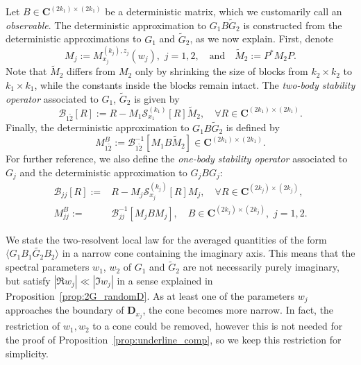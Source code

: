 \documentclass[10pt]{amsart}
\numberwithin{equation}{section}
\newcommand{\C}{\mathbf{C}}
\newcommand{\DD}{\mathbf{D}}
\begin{document}
Let $B\in\C^{(2k_1)\times (2k_1)}$ be a deterministic matrix, which we customarily call an \emph{observable}. The deterministic approximation to $G_1B\widetilde{G}_2$ is constructed from the deterministic approximations to $G_1$ and $\widetilde{G}_2$, as we now explain. First, denote
\begin{equation}
M_j:=M^{(k_j),z_j}_{x_j}(w_j),\, \, j=1,2,\quad\text{and}\quad \widetilde{M}_2:=P^*M_2P.
\label{eq:M_tilde}
\end{equation}
Note that $\widetilde{M}_2$ differs from $M_2$ only by shrinking the size of blocks from $k_2\times k_2$ to $k_1\times k_1$, while the constants inside the blocks remain intact. The \emph{two-body stability operator} associated to $G_1$, $\widetilde{G}_2$ is given by
\begin{equation}
\mathcal{B}_{1\widetilde{2}}[R]:=R - M_1\mathcal{S}^{(k_1)}_{x_1}[R]\widetilde{M}_2,\quad \forall R\in\C^{(2k_1)\times (2k_1)}.
\label{eq:def_B_12}
\end{equation}
Finally, the deterministic approximation to $G_1B\widetilde{G}_2$ is defined by
\begin{equation}
\label{eq:M2def}
M_{1\widetilde{2}}^B:=\mathcal{B}_{1\widetilde{2}}^{-1}[M_1B\widetilde{M}_2]\in\C^{(2k_1)\times (2k_1)}.
\end{equation}
For further reference, we also define the \emph{one-body stability operator} associated to $G_j$ and the deterministic approximation to $G_jBG_j$:
\begin{align}
\mathcal{B}_{jj}[R]:=&R - M_j\mathcal{S}^{(k_j)}_{x_j}[R]M_j,\quad \forall R\in\C^{(2k_j)\times (2k_j)},\label{eq:def_B_11}\\
M_{jj}^B:=&\mathcal{B}_{jj}^{-1}[M_jBM_j],\quad B\in \C^{(2k_j)\times (2k_j)},\,\, j=1,2.\label{eq:def_M_11}
\end{align}


We state the two-resolvent local law for the averaged quantities of the form $\langle G_1B_1\widetilde{G_2}B_2\rangle$ in a narrow cone containing the imaginary axis. This means that the spectral parameters $w_1$, $w_2$ of $G_1$ and $\widetilde{G}_2$ are not necessarily purely imaginary, but satisfy $|\Re w_j|\ll |\Im w_j|$ in a sense explained in Proposition~\ref{prop:2G_randomD}. As at least one of the parameters $w_j$ approaches the boundary of $\DD_{x_j}$, the cone becomes more narrow. In fact, the restriction of $w_1,w_2$ to a cone could be removed, however this is not needed for the proof of Proposition~\ref{prop:underline_comp}, so we keep this restriction for simplicity.
\end{document}

